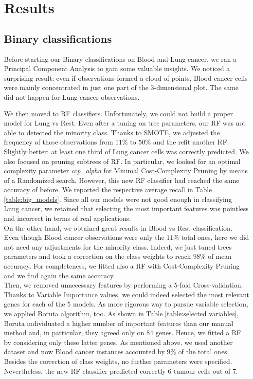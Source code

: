 \documentclass[a4paper,11pt, oneside]{article}  %
\begin{document}
\section{Results}
\subsection{Binary classifications}
Before starting our Binary classifications on Blood and Lung cancer, we ran a Principal Component Analysis to gain some valuable insights. We noticed a surprising result: even if observations formed a cloud of points, Blood cancer cells were mainly concentrated in just one part of the 3-dimensional plot. The same did not happen for Lung cancer observations.

We then moved to RF classifiers. Unfortunately, we could not build a proper model for Lung vs Rest. Even after a tuning on tree parameters, our RF was not able to detected the minority class. Thanks to SMOTE, we adjusted the frequency of those observations from $11\%$ to $50\%$ and the refit another RF. Slightly better: at least one third of Lung cancer cells was correctly predicted. We also focused on pruning subtrees of RF. In particular, we looked for an optimal complexity parameter \textit{ccp\_alpha} for Minimal Cost-Complexity Pruning by means of a Randomized search. However, this new RF classifier had reached the same accuracy of before. We reported the respective average recall in Table \ref{table:big_models}. Since all our models were not good enough in classifying Lung cancer, we retained that selecting the most important features was pointless and incorrect in terms of real applications. \\
On the other hand, we obtained great results in Blood vs Rest classification. Even though Blood cancer observations were only the $11\%$ total ones, here we did not need any adjustments for the minority class. Indeed, we just tuned trees parameters and took a correction on the class weights to reach $98\%$ of mean accuracy. For completeness, we fitted also a RF with Cost-Complexity Pruning and we find again the same accuracy. \\
Then, we removed unnecessary features by performing a 5-fold Cross-validation. Thanks to Variable Importance values, we could indeed selected the most relevant genes for each of the 5 models. As more rigorous way to pursue variable selection, we applied Boruta algorithm, too. As shown in Table \ref{table:selected variables}, Boruta individuated a higher number of important features than our manual method and, in particular, they agreed only on $84$ genes.
Hence, we fitted a RF by considering only these latter genes. As mentioned above, we used another dataset and now Blood cancer instances accounted by $9\%$ of the total ones. Besides the correction of class weights, no further parameters were specified. Nevertheless, the new RF classifier predicted correctly $6$ tumour cells out of $7$.   
\end{document}
